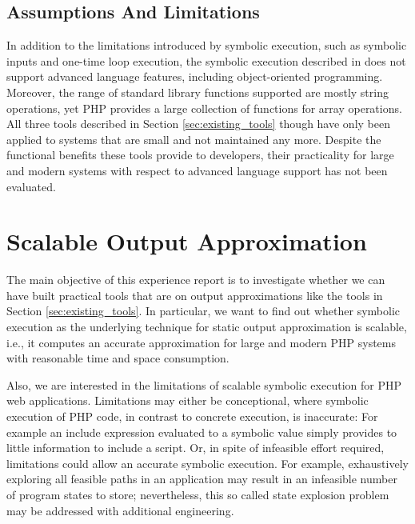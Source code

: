 \documentclass[sigconf]{acmart}
\begin{document}
\subsection{Assumptions And Limitations}\label{sec:limitations}
In addition to the limitations introduced by  symbolic execution, such as
symbolic inputs and one-time loop execution, the symbolic execution described
in \cite{Nguyen:2014:BCG:2635868.2635928} does not support advanced language
features, including object-oriented programming. Moreover, the range of
standard library functions supported are mostly string operations, yet PHP
provides a large collection of functions for array operations.
All three tools described in Section \ref{sec:existing_tools} though have only
been applied to systems that are small and not maintained any more. Despite the
functional benefits these tools provide to developers, their practicality for
large and modern systems with respect to advanced language support has not been
evaluated.

\section{Scalable Output Approximation}%
The main objective of this experience report is to investigate whether we can
have built practical tools that are on output approximations like the tools in
Section \ref{sec:existing_tools}. In particular, we want to find out whether
symbolic execution as the underlying technique for static output approximation
is scalable, i.e., it computes an accurate approximation for large and modern
PHP systems with reasonable time and space consumption.

Also, we are interested in the limitations of scalable symbolic execution for
PHP web applications. Limitations may either be conceptional, where symbolic
execution of PHP code, in contrast to concrete execution, is inaccurate: For
example an include expression evaluated to a symbolic value simply provides to
little information to include a script. Or, in spite of infeasible effort
required, limitations could allow an accurate symbolic execution. For example,
exhaustively exploring all feasible paths in an application may result in an
infeasible number of program states to store; nevertheless, this so called
state explosion problem may be addressed with additional engineering.
\end{document}
